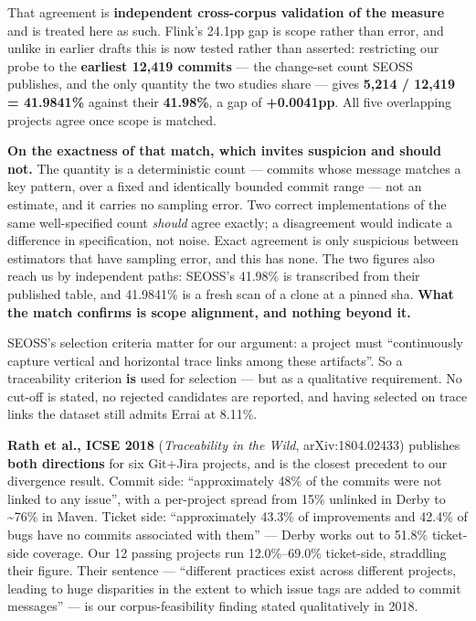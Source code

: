 \documentclass[conference]{IEEEtran}
\begin{document}
That agreement is \textbf{independent cross-corpus validation of the measure} and is treated here as such. Flink's 24.1pp gap is scope rather than error, and unlike in earlier drafts this is now tested rather than asserted: restricting our probe to the \textbf{earliest 12,419 commits} --- the change-set count SEOSS publishes, and the only quantity the two studies share --- gives \textbf{5,214 / 12,419 = 41.9841\%} against their \textbf{41.98\%}, a gap of \textbf{+0.0041pp}. All five overlapping projects agree once scope is matched.

\textbf{On the exactness of that match, which invites suspicion and should not.} The quantity is a deterministic count --- commits whose message matches a key pattern, over a fixed and identically bounded commit range --- not an estimate, and it carries no sampling error. Two correct implementations of the same well-specified count \emph{should} agree exactly; a disagreement would indicate a difference in specification, not noise. Exact agreement is only suspicious between estimators that have sampling error, and this has none. The two figures also reach us by independent paths: SEOSS's 41.98\% is transcribed from their published table, and 41.9841\% is a fresh scan of a clone at a pinned sha. \textbf{What the match confirms is scope alignment, and nothing beyond it.}

SEOSS's selection criteria matter for our argument: a project must ``continuously capture vertical and horizontal trace links among these artifacts''. So a traceability criterion \textbf{is} used for selection --- but as a qualitative requirement. No cut-off is stated, no rejected candidates are reported, and having selected on trace links the dataset still admits Errai at 8.11\%.

\textbf{Rath et al., ICSE 2018} \cite{rath2018traceability} (\emph{Traceability in the Wild}, arXiv:1804.02433) publishes \textbf{both directions} for six Git+Jira projects, and is the closest precedent to our divergence result. Commit side: ``approximately 48\% of the commits were not linked to any issue'', with a per-project spread from 15\% unlinked in Derby to \textasciitilde{}76\% in Maven. Ticket side: ``approximately 43.3\% of improvements and 42.4\% of bugs have no commits associated with them'' --- Derby works out to 51.8\% ticket-side coverage. Our 12 passing projects run 12.0\%--69.0\% ticket-side, straddling their figure. Their sentence --- ``different practices exist across different projects, leading to huge disparities in the extent to which issue tags are added to commit messages'' --- is our corpus-feasibility finding stated qualitatively in 2018.
\end{document}
